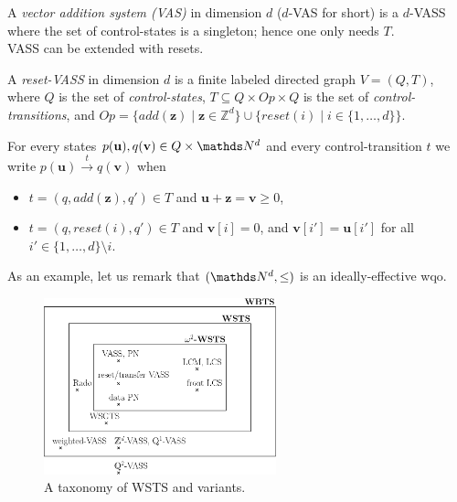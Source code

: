 \documentclass[runningheads]{llncs}
\begin{document}
A {\em vector addition system (VAS)} in dimension $d$ ($d$-VAS for short) is a $d$-VASS where the set of control-states is a singleton; hence one only needs $T$.\\

VASS can be extended with resets.

\begin{definition}
A {\em reset-VASS} in dimension $d$ 
 is a finite 
labeled directed graph $V = (Q,T)$, where $Q$ is the set of {\em control-states}, 
$T \subseteq Q \times Op \times Q$
is the set of {\em control-transitions}, and $Op = \{ add(\textbf{z}) \mid \textbf{z} \in \mathds{Z}^d\} \cup 
		\{ reset(i) \mid i \in \{1,\ldots,d\} \}$.
\end{definition}

For every states $p(\textbf{u}), q(\textbf{v}) \in Q \times \N^d$ and every control-transition $t$ we write
$p(\textbf{u}) \xrightarrow{t} q(\textbf{v})$ when 
\begin{samepage}\begin{itemize}
\item  $t = (q,add(\textbf{z}),q') \in T$
and $\textbf{u}+\textbf{z} = \textbf{v} \geq 0$,
\item $t = (q,reset(i),q') \in T$ 
and
$\textbf{v}[i] = 0$, and $\textbf{v}[i'] = \textbf{u}[i']$ for all $i' \in \{1,\ldots, d\} \setminus i$.
\end{itemize} \end{samepage}

As an example, let us remark that $(\N^d,\leq)$ is an ideally-effective wqo.

 \begin{center}
	\begin{figure}
	\hspace{2.3cm}
\includegraphics[width=0.60\textwidth]{WSTS_taxonomy}
	\caption{A taxonomy of WSTS and variants.}
	\end{figure}
\end{center}
\end{document}
